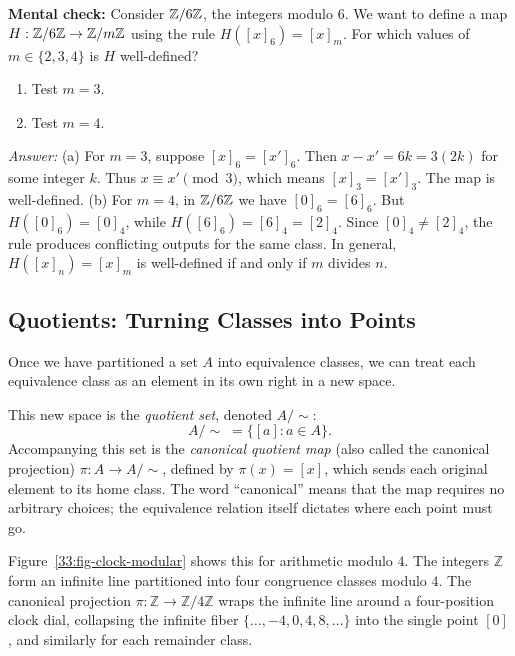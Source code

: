 \begin{recoverybox}
\textbf{Mental check:} Consider $\mathbb{Z}/6\mathbb{Z}$, the integers modulo $6$. We want to define a map $H: \mathbb{Z}/6\mathbb{Z} \to \mathbb{Z}/m\mathbb{Z}$ using the rule $H([x]_6) = [x]_m$. For which values of $m \in \{2, 3, 4\}$ is $H$ well-defined?
\begin{enumerate}[label=(\alph*)]
  \item Test $m = 3$.
  \item Test $m = 4$.
\end{enumerate}
\emph{Answer:} (a) For $m = 3$, suppose $[x]_6 = [x']_6$. Then $x - x' = 6k = 3(2k)$ for some integer $k$. Thus $x \equiv x' \pmod 3$, which means $[x]_3 = [x']_3$. The map is well-defined. (b) For $m = 4$, in $\mathbb{Z}/6\mathbb{Z}$ we have $[0]_6 = [6]_6$. But $H([0]_6) = [0]_4$, while $H([6]_6) = [6]_4 = [2]_4$. Since $[0]_4 \neq [2]_4$, the rule produces conflicting outputs for the same class. In general, $H([x]_n) = [x]_m$ is well-defined if and only if $m$ divides $n$.
\end{recoverybox}

\subsection{Quotients: Turning Classes into Points}

Once we have partitioned a set $A$ into equivalence classes, we can treat each equivalence class as an element in its own right in a new space. 

This new space is the \emph{quotient set}, denoted $A/\!\sim$:
\[
A/\!\sim\; = \{[a] : a \in A\}.
\]
Accompanying this set is the \emph{canonical quotient map} (also called the canonical projection) $\pi: A \to A/\!\sim$, defined by $\pi(x) = [x]$, which sends each original element to its home class. The word ``canonical'' means that the map requires no arbitrary choices; the equivalence relation itself dictates where each point must go.

Figure~\ref{33:fig-clock-modular} shows this for arithmetic modulo $4$. The integers $\mathbb{Z}$ form an infinite line partitioned into four congruence classes modulo $4$. The canonical projection $\pi: \mathbb{Z} \to \mathbb{Z}/4\mathbb{Z}$ wraps the infinite line around a four-position clock dial, collapsing the infinite fiber $\{\dots, -4, 0, 4, 8, \dots\}$ into the single point $[0]$, and similarly for each remainder class.

